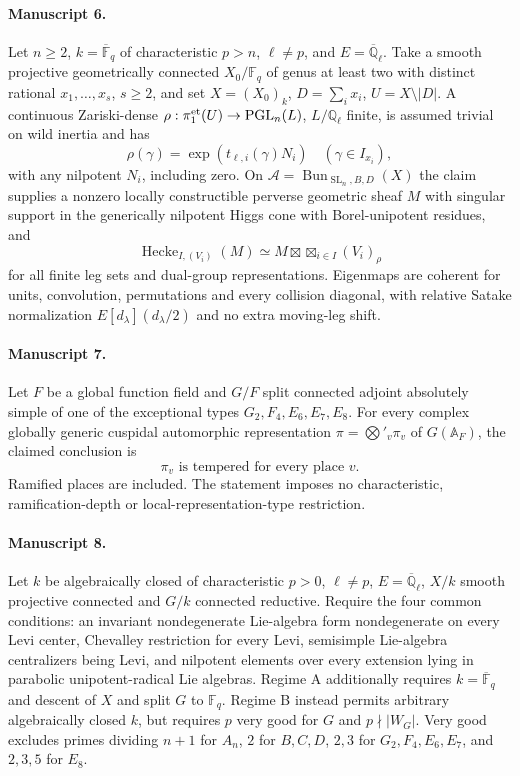 \documentclass[11pt]{article}
\begin{document}
\paragraph{Manuscript 6.}
Let $n\ge2$, $k=\overline{\mathbb F}_q$ of characteristic $p>n$, $\ell\ne p$, and $E=\overline{\mathbb Q}_{\ell}$. Take a smooth projective geometrically connected $X_0/\mathbb F_q$ of genus at least two with distinct rational $x_1,\ldots,x_s$, $s\ge2$, and set $X=(X_0)_k$, $D=\sum_ix_i$, $U=X\setminus|D|$. A continuous Zariski-dense $\rho:\pi_1^{\rm et}(U)\to\operatorname{PGL}_n(L)$, $L/\mathbb Q_{\ell}$ finite, is assumed trivial on wild inertia and has
\[
 \rho(\gamma)=\exp(t_{\ell,i}(\gamma)N_i)\quad(\gamma\in I_{x_i}),
\]
with any nilpotent $N_i$, including zero. On $\mathcal A=\operatorname{Bun}_{\operatorname{SL}_n,B,D}(X)$ the claim supplies a nonzero locally constructible perverse geometric sheaf $M$ with singular support in the generically nilpotent Higgs cone with Borel-unipotent residues, and
\[
 \operatorname{Hecke}_{I,(V_i)}(M)\simeq M\boxtimes\mathop{\boxtimes}_{i\in I}(V_i)_{\rho}
\]
for all finite leg sets and dual-group representations. Eigenmaps are coherent for units, convolution, permutations and every collision diagonal, with relative Satake normalization $E[d_{\lambda}](d_{\lambda}/2)$ and no extra moving-leg shift.

\paragraph{Manuscript 7.}
Let $F$ be a global function field and $G/F$ split connected adjoint absolutely simple of one of the exceptional types $G_2,F_4,E_6,E_7,E_8$. For every complex globally generic cuspidal automorphic representation $\pi=\bigotimes'_v\pi_v$ of $G(\mathbb A_F)$, the claimed conclusion is
\[
 \pi_v\text{ is tempered for every place }v.
\]
Ramified places are included. The statement imposes no characteristic, ramification-depth or local-representation-type restriction.

\paragraph{Manuscript 8.}
Let $k$ be algebraically closed of characteristic $p>0$, $\ell\ne p$, $E=\overline{\mathbb Q}_{\ell}$, $X/k$ smooth projective connected and $G/k$ connected reductive. Require the four common conditions: an invariant nondegenerate Lie-algebra form nondegenerate on every Levi center, Chevalley restriction for every Levi, semisimple Lie-algebra centralizers being Levi, and nilpotent elements over every extension lying in parabolic unipotent-radical Lie algebras. Regime A additionally requires $k=\overline{\mathbb F}_q$ and descent of $X$ and split $G$ to $\mathbb F_q$. Regime B instead permits arbitrary algebraically closed $k$, but requires $p$ very good for $G$ and $p\nmid|W_G|$. Very good excludes primes dividing $n+1$ for $A_n$, $2$ for $B,C,D$, $2,3$ for $G_2,F_4,E_6,E_7$, and $2,3,5$ for $E_8$.
\end{document}
